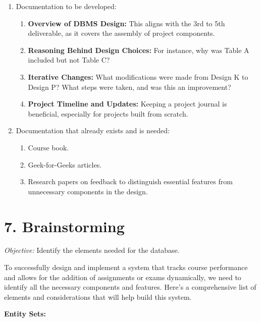 \documentclass[12pt]{article}
\begin{document}
\begin{enumerate}
    \item Documentation to be developed:
    \begin{enumerate}[leftmargin=0.75cm]
        \item \textbf{Overview of DBMS Design:} This aligns with the 3rd to 5th deliverable, as it covers the assembly of project components.
        \item \textbf{Reasoning Behind Design Choices:} For instance, why was Table A included but not Table C?
        \item \textbf{Iterative Changes:} What modifications were made from Design K to Design P? What steps were taken, and was this an improvement?
        \item \textbf{Project Timeline and Updates:} Keeping a project journal is beneficial, especially for projects built from scratch.
    \end{enumerate}
    \item Documentation that already exists and is needed:
    \begin{enumerate}[leftmargin=0.75cm]
        \item Course book.
        \item Geek-for-Geeks articles.
        \item Research papers on feedback to distinguish essential features from unnecessary components in the design.
    \end{enumerate}
\end{enumerate}

\section*{7. Brainstorming}
\textit{Objective:} Identify the elements needed for the database.

To successfully design and implement a system that tracks course performance and allows for the addition of assignments or exams dynamically, we need to identify all the necessary components and features. Here’s a comprehensive list of elements and considerations that will help build this system.

\textbf{Entity Sets:}
\end{document}
